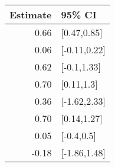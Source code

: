 \begin{tabular}{rl}
  \hline
Estimate & 95\% CI \\ 
  \hline
0.66 & [0.47,0.85] \\ 
  0.06 & [-0.11,0.22] \\ 
  0.62 & [-0.1,1.33] \\ 
  0.70 & [0.11,1.3] \\ 
  0.36 & [-1.62,2.33] \\ 
  0.70 & [0.14,1.27] \\ 
  0.05 & [-0.4,0.5] \\ 
  -0.18 & [-1.86,1.48] \\ 
   \hline
\end{tabular}

